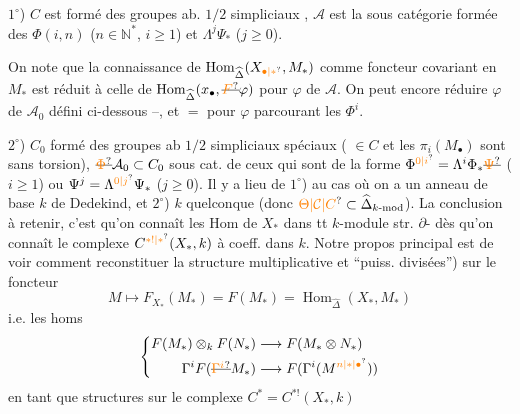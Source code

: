 $1^\circ$) $C$ est formé des groupes ab. $1/2$ simpliciaux
, $\mathcal A$ est la
sous catégorie formée des
$\Phi(i,n)$ ($n\in\mathbb N^*$,  $i\geq1$) et $\Lambda^j\Psi_*$ ($j\geq0$).

On note que  la connaissance de
$\operatorname{Hom}_{\widehat\Delta}(X_{\unsure{\bullet|*}},M_*)$ comme foncteur
covariant en $M_*$ est réduit à
celle de $\operatorname{Hom}_{\widehat\Delta}(x_{\bullet},\deleted{\unsure{F}}\varphi)$ pour
$\varphi$ de $\mathcal A$. On peut encore
réduire  $\varphi$ de $\mathcal A_0$ défini
ci-dessous --, et $=$ pour $\varphi$ parcourant
les $\Phi^i$.

$2^\circ$) $C_0$   formé \unsure{:} des groupes ab
$1/2$ simpliciaux  spéciaux
( $\in C$ et les $\pi_i(M_{\bullet})$ sont
sans torsion), $\deleted{\unsure{\Phi}}\mathcal A_0\subset C_0$ sous cat.
de ceux qui sont de la forme
$\Phi^{\unsure{0|i}}=\Lambda^i\Phi_*\deleted{\unsure{\Psi}}$ ($i\geq1$) ou $\Psi^j=\Lambda^{\unsure{0|j}}\Psi_*$ ($j\geq0$).
Il y a lieu de 
$1^\circ$) au cas où on a un anneau
de base $k$ de Dedekind,
et $2^\circ$)  $k$ quelconque 
(donc $\unsure{\Theta|\mathcal C|C}\subset\widehat\Delta_{k\text{-}\mathrm{mod}}$). La 
conclusion à retenir, c'est
qu'on connaît les Hom de
$X_*$ dans tt $k$-module str.
$\partial$- dès qu'on connaît
le complexe  $C^{\unsure{*!|*}}(X_*,k)$ à coeff. dans
$k$. Notre propos principal
est de voir comment reconstituer
la structure multiplicative
et ``puiss. divisées'') sur le
foncteur
\[
 M\mapsto F_{X_*}(M_*)=F(M_*)=\operatorname{Hom}_{\widehat\Delta}(X_*,M_*)
\]
i.e. les homs
\[
 \left\{\begin{aligned}
 F(M_*)\otimes_k F(N_*)&\longrightarrow F(M_*\otimes N_*)\\
 \Gamma^i F(\deleted{\unsure{\Gamma^i}}M_*)&\longrightarrow F(\Gamma^i(M^{\unsure{n|*|\bullet}}))
 \end{aligned}\right.
\]
en tant que  structures
sur le complexe  $C^*=C^{*!}(X_*,k)$

